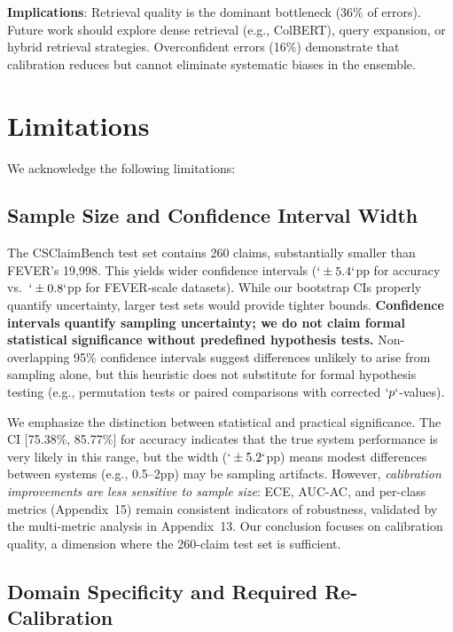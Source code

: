\textbf{Implications}: Retrieval quality is the dominant bottleneck (36\% of errors). Future work should explore dense retrieval (e.g., ColBERT), query expansion, or hybrid retrieval strategies. Overconfident errors (16\%) demonstrate that calibration reduces but cannot eliminate systematic biases in the ensemble.

\section{Limitations}\label{limitations}

We acknowledge the following limitations:

\subsection{Sample Size and Confidence Interval Width}\label{sample-size-and-confidence-interval-width}

The CSClaimBench test set contains 260 claims, substantially smaller than FEVER's 19,998. This yields wider confidence intervals (\(`\pm5.4`\)pp for accuracy vs.~\(`\pm0.8`\)pp for FEVER-scale datasets). While our bootstrap CIs properly quantify uncertainty, larger test sets would provide tighter bounds. \textbf{Confidence intervals quantify sampling uncertainty; we do not claim formal statistical significance without predefined hypothesis tests.} Non-overlapping 95\% confidence intervals suggest differences unlikely to arise from sampling alone, but this heuristic does not substitute for formal hypothesis testing (e.g., permutation tests or paired comparisons with corrected \(`p`\)-values).

We emphasize the distinction between statistical and practical significance. The CI {[}75.38\%, 85.77\%{]} for accuracy indicates that the true system performance is very likely in this range, but the width (\(`\pm 5.2`\)pp) means modest differences between systems (e.g., 0.5--2pp) may be sampling artifacts. However, \emph{calibration improvements are less sensitive to sample size}: ECE, AUC-AC, and per-class metrics (Appendix~15) remain consistent indicators of robustness, validated by the multi-metric analysis in Appendix~13. Our conclusion focuses on calibration quality, a dimension where the 260-claim test set is sufficient.

\subsection{Domain Specificity and Required Re-Calibration}\label{domain-specificity-and-required-re-calibration}

